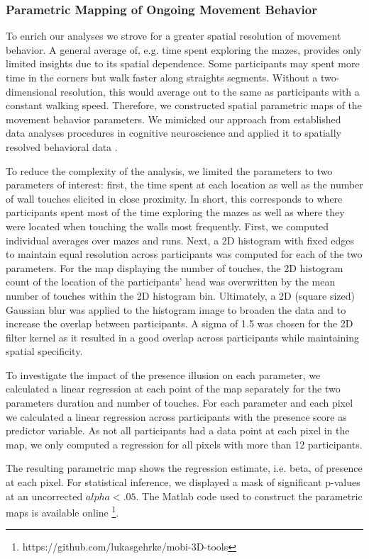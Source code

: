 \subsubsection{Parametric Mapping of Ongoing Movement Behavior} To enrich our analyses we strove for a greater spatial resolution of movement behavior. A general average of, e.g. time spent exploring the mazes, provides only limited insights due to its spatial dependence. Some participants may spent more time in the corners but walk faster along straights segments. Without a two-dimensional resolution, this would average out to the same as participants with a constant walking speed. Therefore, we constructed spatial parametric maps of the movement behavior parameters. We mimicked our approach from established data analyses procedures in cognitive neuroscience and applied it to spatially resolved behavioral data \cite{Friston1994, Bridwell2018a}.

To reduce the complexity of the analysis, we limited the parameters to two parameters of interest: first, the time spent at each location as well as the number of wall touches elicited in close proximity. In short, this corresponds to where participants spent most of the time exploring the mazes as well as where they were located when touching the walls most frequently. First, we computed individual averages over mazes and runs. Next, a 2D histogram with fixed edges to maintain equal resolution across participants was computed for each of the two parameters. For the map displaying the number of touches, the 2D histogram count of the location of the participants' head was overwritten by the mean number of touches within the 2D histogram bin. Ultimately, a 2D (square sized) Gaussian blur was applied to the histogram image to broaden the data and to increase the overlap between participants. A sigma of 1.5 was chosen for the 2D filter kernel as it resulted in a good overlap across participants while maintaining spatial specificity.

To investigate the impact of the presence illusion on each parameter, we calculated a linear regression at each point of the map separately for the two parameters duration and number of touches. For each parameter and each pixel we calculated a linear regression across participants with the presence score as predictor variable. As not all participants had a data point at each pixel in the map, we only computed a regression for all pixels with more than 12 participants.

The resulting parametric map shows the regression estimate, i.e. beta, of presence at each pixel. For statistical inference, we displayed a mask of significant p-values at an uncorrected $alpha < .05$. The Matlab code used to construct the parametric maps is available online \footnote{https://github.com/lukasgehrke/mobi-3D-tools}.